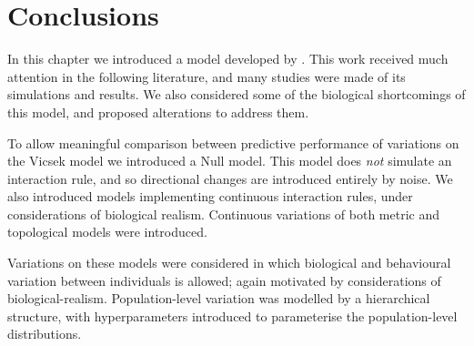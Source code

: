 \section*{Conclusions}

In this chapter we introduced a model developed by \textcite{vicsek95}. This
work received much attention in the following literature, and many studies were
made of its simulations and results. We also considered some of the biological
shortcomings of this model, and proposed alterations to address them.

To allow meaningful comparison between predictive performance of variations on
the Vicsek model we introduced a Null model. This model does \emph{not}
simulate an interaction rule, and so directional changes are introduced
entirely by noise. We also introduced models implementing continuous
interaction rules, under considerations of biological realism. Continuous
variations of both metric and topological models were introduced.

Variations on these models were considered in which biological and behavioural
variation between individuals is allowed; again motivated by considerations of
biological-realism. Population-level variation was modelled by a hierarchical
structure, with hyperparameters introduced to parameterise the population-level
distributions.

